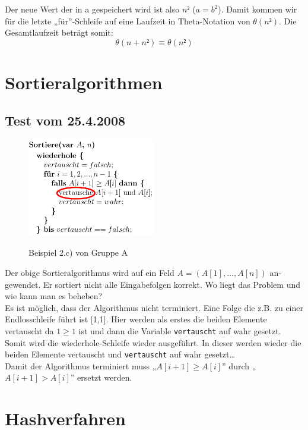 \documentclass[a4paper, 12pt]{article}
\begin{document}
Der neue Wert der in a gespeichert wird ist also $n²$ ($a=b^2$). Damit kommen wir für die letzte „für”-Schleife auf eine Laufzeit in Theta-Notation von $θ(n²)$. Die Gesamtlaufzeit beträgt somit: $$θ\left(n+n²\right) \equiv θ\left(n²\right)$$

\section{Sortieralgorithmen}

\subsection{Test vom 25.4.2008}

\begin{figure}[H]
	\caption{Beispiel 2.c) von Gruppe A}
	\vskip 0.2cm
	\centering
	\includegraphics[width=0.5\textwidth]{Figures/Test_2008-04-25_2Ab}
	\label{figure:Test_2008-04-25_2Ab}
\end{figure}

Der obige Sortieralgorithmus wird auf ein Feld $A=\left(A[1],\dots,A[n]\right)$ an-gewendet. Er sortiert nicht alle Eingabefolgen korrekt. Wo liegt das Problem und wie kann man es beheben?\\

Es ist möglich, dass der Algorithmus nicht terminiert. Eine Folge die z.B. zu einer Endlosschleife führt ist [1,1]. Hier werden als erstes die beiden Elemente vertauscht da $1≥1$ ist und dann die Variable \texttt{vertauscht} auf wahr gesetzt. Somit wird die wiederhole-Schleife wieder ausgeführt. In dieser werden wieder die beiden Elemente vertauscht und \texttt{vertauscht} auf wahr gesetzt\dots\\

Damit der Algorithmus terminiert muss „$A[i+1]≥ A[i]$” durch „$A[i+1] > A[i]$” ersetzt werden.

\section{Hashverfahren}
\end{document}
